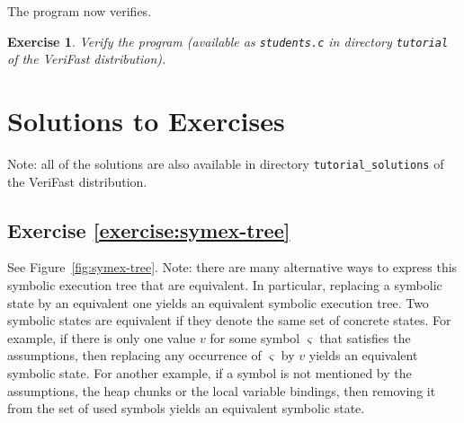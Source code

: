 \documentclass{article}
\newtheorem{exercise}{Exercise}
\begin{document}
The program now verifies.

\begin{exercise}
Verify the program (available as \lstinline!students.c! in
directory \lstinline!tutorial! of the VeriFast distribution).
\end{exercise}

\section{Solutions to Exercises}

Note: all of the solutions are also available in directory \verb|tutorial_solutions| of the VeriFast distribution.

\subsection{Exercise \ref{exercise:symex-tree}}

See Figure~\ref{fig:symex-tree}. Note: there are many alternative ways to express this symbolic execution tree that are equivalent. In particular, replacing a symbolic state by an equivalent one yields an equivalent symbolic execution tree. Two symbolic states are equivalent if they denote the same set of concrete states. For example, if there is only one value $v$ for some symbol $\varsigma$ that satisfies the assumptions, then replacing any occurrence of $\varsigma$ by $v$ yields an equivalent symbolic state. For another example, if a symbol is not mentioned by the assumptions, the heap chunks or the local variable bindings, then removing it from the set of used symbols yields an equivalent symbolic state.
\end{document}
